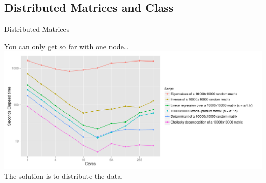 \subsection{Distributed Matrices and Class }
\makesubcontentsslidessec

\begin{frame}
  \begin{block}{Distributed Matrices}\pause
  \begin{center}
  You can only get so far with one node\dots\\[.4cm]
    \includegraphics[width=.95\textwidth]{../common/pics/r_mkl_times}
    \\[.4cm]
    The solution is to distribute the data.
  \end{center}
  \end{block}
\end{frame}

